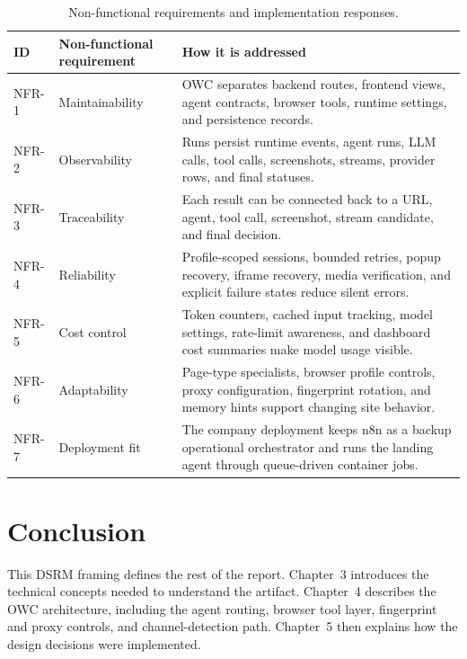 \begin{table}[H]
\centering
\small
\renewcommand{\arraystretch}{0.96}
\begin{tabularx}{\textwidth}{Q{1.35cm} Y Y}
\toprule
{}
ID & Non-functional requirement & How it is addressed \\
\midrule
NFR-1 & Maintainability & OWC separates backend routes, frontend views, agent
contracts, browser tools, runtime settings, and persistence records. \\
NFR-2 & Observability & Runs persist runtime events, agent runs, LLM calls, tool
calls, screenshots, streams, provider rows, and final statuses. \\
NFR-3 & Traceability & Each result can be connected back to a URL, agent, tool
call, screenshot, stream candidate, and final decision. \\
NFR-4 & Reliability & Profile-scoped sessions, bounded retries, popup recovery,
iframe recovery, media verification, and explicit failure states reduce silent
errors. \\
NFR-5 & Cost control & Token counters, cached input tracking, model settings,
rate-limit awareness, and dashboard cost summaries make model usage visible. \\
NFR-6 & Adaptability & Page-type specialists, browser profile controls, proxy
configuration, fingerprint rotation, and memory hints support changing site
behavior. \\
NFR-7 & Deployment fit & The company deployment keeps n8n as a backup operational
orchestrator and runs the landing agent through queue-driven container jobs. \\
\bottomrule
\end{tabularx}
\caption{Non-functional requirements and implementation responses.}\label{tab:nfr-summary}
\end{table}

\section{Conclusion}

This DSRM framing defines the rest of the report. Chapter~3 introduces the technical
concepts needed to understand the artifact. Chapter~4 describes the OWC architecture,
including the agent routing, browser tool layer, fingerprint and proxy controls, and
channel-detection path. Chapter~5 then explains how the design decisions were
implemented.

